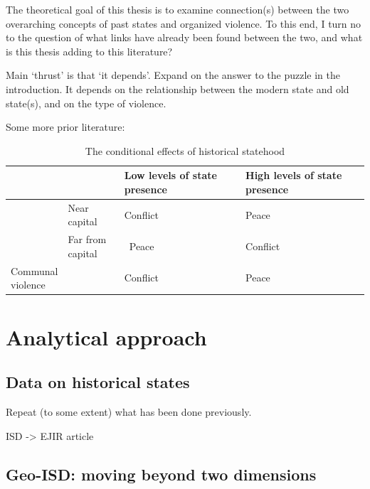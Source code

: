 \documentclass[12pt]{article}
\begin{document}
The theoretical goal of this thesis is to examine connection(s) between the two
overarching concepts of past states and organized violence. To this end, I turn
no to the question of what links have already been found between the two, and
what is this thesis adding to this literature? 

Main `thrust' is that `it depends'. Expand on the answer to the puzzle in the
introduction. It depends on the relationship between the modern state and old
state(s), and on the type of violence.

Some more prior literature: \citet{Griffiths2016} \citet{Ahram2019}

\begin{table}
\begin{tabularx}{\textwidth}{>{\centering\arraybackslash}X>{\centering\arraybackslash}X|>{\centering\arraybackslash}X|>{\centering\arraybackslash}X}
    & & {Low levels of state presence} & {High levels of state presence} \\
\midrule
     \multirow{2}{=}{\centering State based violence} & Near capital & Conflict &  Peace \\
     \cmidrule{2-4}
					   & \makecell{Far from \\ capital} & \ Peace & Conflict \\
\midrule
     \makecell{Communal\\ violence} & & Conflict & Peace \\
\end{tabularx}
\caption{The conditional effects of historical statehood}
\end{table}


\section{Analytical approach} \label{Analytical approach}


\subsection{Data on historical states} \label{Data on historical states}

Repeat (to some extent) what has been done previously.

ISD -> EJIR article 

\subsection{Geo-ISD: moving beyond two dimensions} 
\label{Geo-ISD}
\end{document}
